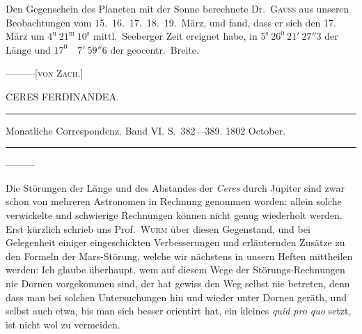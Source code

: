 Den Gegenschein des Planeten mit der Sonne berechnete Dr.\ \textsc{Gauss} aus unseren Beobachtungen vom 15.\ 16.\ 17.\ 18.\ 19.\ März, und fand, dass er sich den 17. März um $4^{\mathrm{u}}\ 21^{\mathrm{m}}\ 10^{\mathrm{s}}$ mittl.\ Seeberger Zeit ereignet habe, in $5^{\mathrm{s}}\ 26^0\ 21'\ 27''3$ der Länge und $17^0\quad7'\ 59''6$ der geocentr.\ Breite.
\par\noindent —\quad —\quad —\hfill [\textsc{von Zach}.]\par

\bigskip{}
\begin{center}
CERES FERDINANDEA.\par
\medskip\hrule\medskip
Monatliche Correspondenz. Band VI. S.\ 382—389. 1802 October.\par
\medskip\hrule
\end{center}\medskip
—\quad —\quad —

Die Störungen der Länge und des Abstandes der \textit{Ceres} durch Jupiter sind zwar schon von mehreren Astronomen in Rechnung genommen worden: allein solche verwickelte und schwierige Rechnungen können nicht genug wiederholt werden. Erst kürzlich schrieb uns Prof.\ \textsc{Wurm} über diesen Gegenstand, und bei Gelegenheit einiger eingeschickten Verbesserungen und erläuternden Zusätze zu den Formeln der
\newcommand{\JupiterSymbol}{\text{\mdseries\AstroSymbols ♃}}
%
Mars-Störung, welche wir nächstens in unsern Heften mittheilen werden: Ich glaube überhaupt, wem auf diesem Wege der Störungs-Rechnungen nie Dornen vorgekommen sind, der hat gewiss den Weg selbst nie betreten, denn dass man bei solchen Untersuchungen hin und wieder unter Dornen geräth, und selbst auch etwa, bis man sich besser orientirt hat, ein kleines \textit{quid pro quo} setzt, ist nicht wol zu vermeiden.

